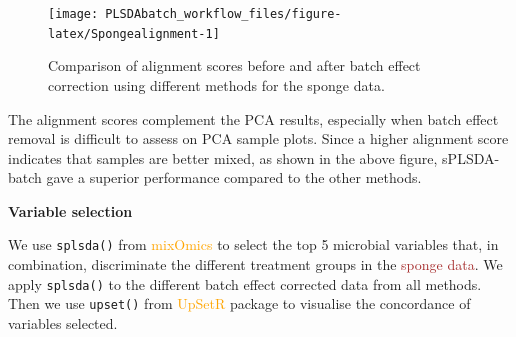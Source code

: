 \documentclass[
]{book}
\newenvironment{Shaded}{\begin{snugshade}}{\end{snugshade}}
\newcommand{\AttributeTok}[1]{\textcolor[rgb]{0.77,0.63,0.00}{#1}}
\newcommand{\DecValTok}[1]{\textcolor[rgb]{0.00,0.00,0.81}{#1}}
\newcommand{\FloatTok}[1]{\textcolor[rgb]{0.00,0.00,0.81}{#1}}
\newcommand{\FunctionTok}[1]{\textcolor[rgb]{0.00,0.00,0.00}{#1}}
\newcommand{\NormalTok}[1]{#1}
\newcommand{\SpecialCharTok}[1]{\textcolor[rgb]{0.00,0.00,0.00}{#1}}
\newcommand{\StringTok}[1]{\textcolor[rgb]{0.31,0.60,0.02}{#1}}
\begin{document}
\begin{Shaded}
\end{Shaded}

\begin{figure}

{\centering \texttt{[image: PLSDAbatch\_workflow\_files/figure-latex/Spongealignment-1]} 

}

\caption{Comparison of alignment scores before and after batch effect correction using different methods for the sponge data.}\label{fig:Spongealignment}
\end{figure}

The alignment scores complement the PCA results, especially when batch effect removal is difficult to assess on PCA sample plots. Since a higher alignment score indicates that samples are better mixed, as shown in the above figure, sPLSDA-batch gave a superior performance compared to the other methods.

\textbf{Variable selection}

We use \texttt{splsda()} from \textcolor{orange}{mixOmics} to select the top 5 microbial variables that, in combination, discriminate the different treatment groups in the \textcolor{brown}{sponge data}. We apply \texttt{splsda()} to the different batch effect corrected data from all methods. Then we use \texttt{upset()} from \textcolor{orange}{UpSetR} package \citep{lex2014upset} to visualise the concordance of variables selected.
\end{document}
